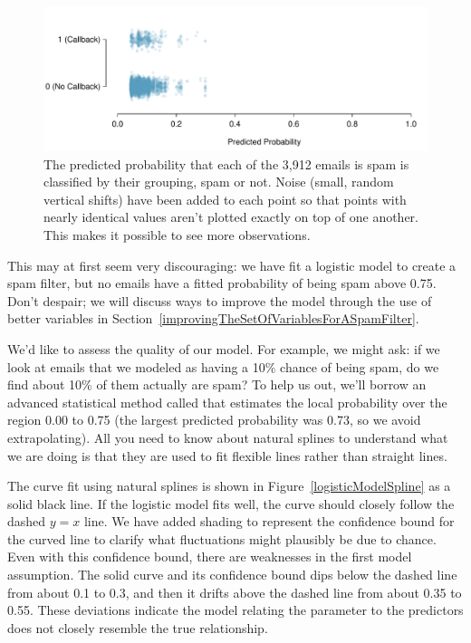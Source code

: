 \begin{figure}[h]
\centering
\includegraphics[width=\textwidth]{ch_regr_mult_and_log/figures/logisticModel/logisticModelPredict}
\caption{The predicted probability that each of the 3,912 emails is spam is classified by their grouping, spam or not. Noise (small, random vertical shifts) have been added to each point so that points with nearly identical values aren't plotted exactly on top of one another. This makes it possible to see more observations.}
\label{logisticModelPredict}
\end{figure}

This may at first seem very discouraging: we have fit a logistic model to create a spam filter, but no emails have a fitted probability of being spam above 0.75. Don't despair; we will discuss ways to improve the model through the use of better variables in Section~\ref{improvingTheSetOfVariablesForASpamFilter}.

We'd like to assess the quality of our model. For example, we might ask: if we look at emails that we modeled as having a 10\% chance of being spam, do we find about 10\% of them actually are spam? To help us out, we'll borrow an advanced statistical method called  that estimates the local probability over the region 0.00 to 0.75 (the largest predicted probability was 0.73, so we avoid extrapolating). All you need to know about natural splines to understand what we are doing is that they are used to fit flexible lines rather than straight lines.

The curve fit using natural splines is shown in Figure~\ref{logisticModelSpline} as a solid black line. If the logistic model fits well, the curve should closely follow the dashed $y=x$ line. We have added shading to represent the confidence bound for the curved line to clarify what fluctuations might plausibly be due to chance. Even with this confidence bound, there are weaknesses in the first model assumption. The solid curve and its confidence bound dips below the dashed line from about 0.1 to 0.3, and then it drifts above the dashed line from about 0.35 to 0.55. These deviations indicate the model relating the parameter to the predictors does not closely resemble the true relationship.

